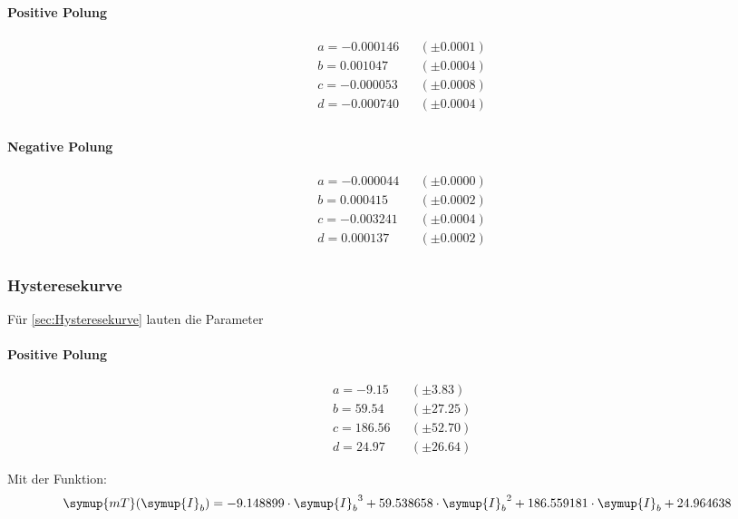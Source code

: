 \begin{minipage}{0.49\textwidth}
\centering
\paragraph{Positive Polung}
\begin{align*}
&a = -0.000146 &&(\pm  0.0001) \\
&b = 0.001047 &&(\pm  0.0004 ) \\
&c = -0.000053 &&(\pm  0.0008) \\
&d = -0.000740 &&(\pm  0.0004) \\
\end{align*}
\end{minipage}
\hfill
\begin{minipage}{0.49\textwidth}
\centering
\paragraph{Negative Polung}
\begin{align*}
&a = -0.000044 &&(\pm 0.0000) \\
&b = 0.000415 &&(\pm 0.0002) \\
&c = -0.003241 &&(\pm 0.0004) \\
&d = 0.000137 &&(\pm 0.0002) \\
\end{align*}
\end{minipage}




\subsubsection{Hysteresekurve}
Für \ref{sec:Hysteresekurve} lauten die Parameter
\vspace{1cm}

\begin{minipage}{0.3\textwidth}
\centering
\paragraph{Positive Polung}
\begin{align*}
&a = -9.15 &&(\pm 3.83) \\
&b = 59.54 &&(\pm 27.25) \\
&c = 186.56 &&(\pm 52.70) \\
&d = 24.97 &&(\pm 26.64)
\end{align*}
\end{minipage}
\hfill
\begin{minipage}{0.69\textwidth}
Mit der Funktion:
{\footnotesize
\begin{equation*}
 \symup{mT}(\symup{I}_b)=-9.148899 \cdot {\symup{I}_b}^3 + 59.538658 \cdot {\symup{I}_b}^2 + 186.559181 \cdot {\symup{I}_b} + 24.964638
\end{equation*}
}
\end{minipage}



